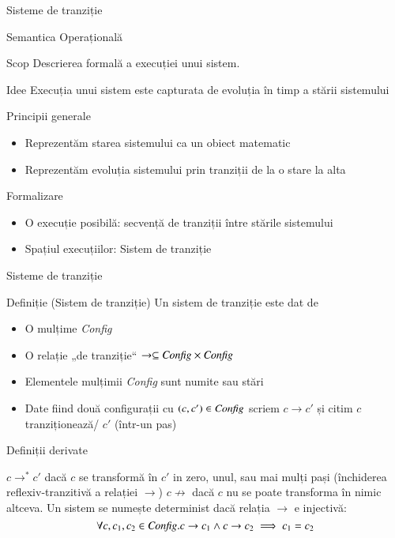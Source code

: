 \documentclass[handout,xcolor=pdftex,romanian,colorlinks]{beamer}
\begin{document}
\begin{section}{Sisteme de tranziție}
\begin{frame}{Semantica Operațională}
\begin{block}{Scop}
Descrierea formală a execuției unui sistem.
\end{block}
\begin{block}{Idee}
Execuția unui sistem este capturata de evoluția în timp a stării sistemului
\end{block}
\begin{block}{Principii generale}
\begin{itemize}
\item Reprezentăm starea sistemului ca un obiect matematic
\item Reprezentăm evoluția sistemului prin tranziții de la o stare la alta
\end{itemize}
\end{block}
\begin{block}{Formalizare}
\begin{itemize}
\item O execuție posibilă: secvență de tranziții între stările sistemului
\item Spațiul execuțiilor: Sistem de tranziție
\end{itemize}
\end{block}
\end{frame}
\begin{frame}{Sisteme de tranziție}{}
\begin{block}{Definiție (Sistem de tranziție)}
Un sistem de tranziție este dat de 
\begin{itemize}
\item O mulțime {\it Config}
\item O relație „de tranziție“ $\rightarrow \subseteq {\it Config} \times {\it Config}$
\end{itemize}
\end{block}

\begin{itemize}
\item Elementele mulțimii {\it Config} sunt numite  sau stări
\item Date fiind două configurații cu $(c,c') \in {\it Config}$ scriem $c \rightarrow c'$ și citim $c$ tranziționează/ $c'$ (într-un pas)
\end{itemize}
\end{frame}

\begin{frame}{Definiții derivate}
\begin{description}
\vitem[$\rightarrow^\ast$] $c \rightarrow^\ast c'$ dacă $c$ se transformă în $c'$ in zero, unul, sau mai mulți pași (închiderea reflexiv-tranzitivă a relației $\rightarrow$)
\vitem[$\not\rightarrow$] $c \not\rightarrow$ dacă $c$ nu se poate transforma în nimic altceva.
\vitem[Determinism] Un sistem se numește determinist dacă relația $\rightarrow$ e injectivă:
\[\forall c, c_1, c_2\in {\it Config} . c \rightarrow c_1 \wedge c \rightarrow c_2 \implies c_1 = c_2\]
\end{description}
\end{frame}
\end{section}
\end{document}
